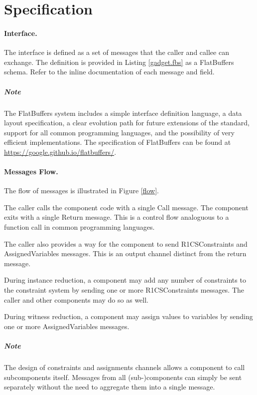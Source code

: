 \section{Specification}

\paragraph{Interface.}

	The interface is defined as a set of messages that the caller and callee can exchange.
	The definition is provided in Listing \ref{gadget.fbs} as a FlatBuffers schema.
	Refer to the inline documentation of each message and field.

	\subparagraph{Note}
	The FlatBuffers system includes a simple interface definition language,
	a data layout specification,
	a clear evolution path for future extensions of the standard,
	support for all common programming languages,
	and the possibility of very efficient implementations.
	The specification of FlatBuffers can be found at
	\href{https://google.github.io/flatbuffers/}{https://google.github.io/flatbuffers/}.

\paragraph{Messages Flow.}

	The flow of messages is illustrated in Figure \ref{flow}.

	The caller calls the component code with a single Call message.
	The component exits with a single Return message.
	This is a control flow analoguous to a function call in common programming languages.

	The caller also provides a way for the component to send 
	R1CSConstraints and AssignedVariables messages.
	This is an output channel distinct from the return message.

	During instance reduction,
	a component may add any number of constraints to the constraint system
	by sending one or more R1CSConstraints messages.
	The caller and other components may do so as well.

	During witness reduction,
	a component may assign values to variables
	by sending one or more AssignedVariables messages.

	\subparagraph{Note}
	The design of constraints and assignments channels
	allows a component to call subcomponents itself.
	Messages from all (sub-)components can simply be sent separately
	without the need to aggregate them into a single message.
	
